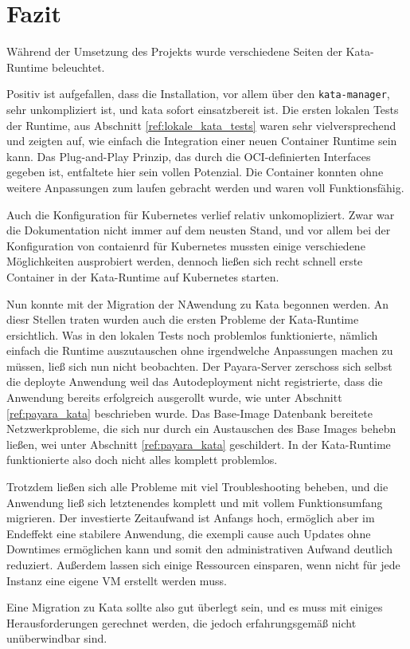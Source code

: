 \chapter{Fazit}

Während der Umsetzung des Projekts wurde verschiedene Seiten der Kata-Runtime beleuchtet.

Positiv ist aufgefallen, dass die Installation, vor allem über den \texttt{kata-manager}, sehr unkompliziert ist, und kata sofort einsatzbereit ist.
Die ersten lokalen Tests der Runtime, aus Abschnitt \ref{ref:lokale_kata_tests} waren sehr vielversprechend und zeigten auf, wie einfach die Integration einer neuen Container Runtime sein kann.
Das Plug-and-Play Prinzip, das durch die \ac{OCI}-definierten Interfaces gegeben ist, entfaltete hier sein vollen Potenzial.
Die Container konnten ohne weitere Anpassungen zum laufen gebracht werden und waren voll Funktionsfähig.

Auch die Konfiguration für Kubernetes verlief relativ unkomopliziert. 
Zwar war die Dokumentation nicht immer auf dem neusten Stand, und vor allem bei der Konfiguration von contaienrd für Kubernetes mussten einige verschiedene Möglichkeiten ausprobiert werden, dennoch ließen sich recht schnell erste Container in der Kata-Runtime auf Kubernetes starten.

Nun konnte mit der Migration der NAwendung zu Kata begonnen werden.
An diesr Stellen traten wurden auch die ersten Probleme der Kata-Runtime ersichtlich.
Was in den lokalen Tests noch problemlos funktionierte, nämlich einfach die Runtime auszutauschen ohne irgendwelche Anpassungen machen zu müssen, ließ sich nun nicht beobachten.
Der Payara-Server zerschoss sich selbst die deployte Anwendung weil das Autodeployment nicht registrierte, dass die Anwendung bereits erfolgreich ausgerollt wurde, wie unter Abschnitt \ref{ref:payara_kata} beschrieben wurde.
Das Base-Image Datenbank bereitete Netzwerkprobleme, die sich nur durch ein Austauschen des Base Images behebn ließen, wei unter Abschnitt \ref{ref:payara_kata} geschildert.
In der Kata-Runtime funktionierte also doch nicht alles komplett problemlos.

Trotzdem ließen sich alle Probleme mit viel Troubleshooting beheben, und die Anwendung ließ sich letztenendes komplett und mit vollem Funktionsumfang migrieren.
Der investierte Zeitaufwand ist Anfangs hoch, ermöglich aber im Endeffekt eine stabilere Anwendung, die exempli cause auch Updates ohne Downtimes ermöglichen kann und somit den administrativen Aufwand deutlich reduziert.
Außerdem lassen sich einige Ressourcen einsparen, wenn nicht für jede Instanz eine eigene \ac{VM} erstellt werden muss.

Eine Migration zu Kata sollte also gut überlegt sein, und es muss mit einiges Herausforderungen gerechnet werden, die jedoch erfahrungsgemäß nicht unüberwindbar sind.
